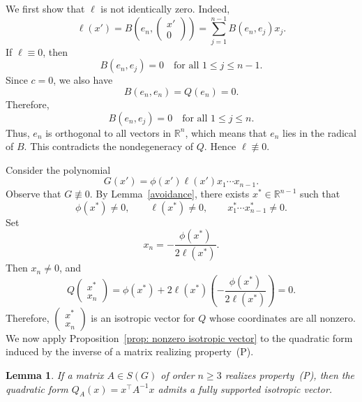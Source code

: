 \documentclass[12pt,reqno]{amsart}
\newtheorem{lem}[thm]{Lemma}
\theoremstyle{definition}
\numberwithin{equation}{subsection}
\newenvironment{pf}{\proof}{\endproof}
\numberwithin{equation}{section}
\begin{document}
\begin{pf}
We first show that $\ell$ is not identically zero. Indeed,
\[
\ell(x')=
B\left(e_n,\begin{pmatrix}x'\\0\end{pmatrix}\right)
=
\sum_{j=1}^{n-1}B(e_n,e_j)x_j.
\]
If $\ell\equiv 0$, then
\[
B(e_n,e_j)=0
\quad\text{for all } 1\le j\le n-1.
\]
Since $c=0$, we also have
\[
B(e_n,e_n)=Q(e_n)=0.
\]
Therefore,
\[
B(e_n,e_j)=0
\quad\text{for all } 1\le j\le n.
\]
Thus, $e_n$ is orthogonal to all vectors in $\mathbb{R}^n$, which means that
$e_n$ lies in the radical of $B$. This contradicts the nondegeneracy of $Q$.
Hence $\ell\not\equiv 0$.

Consider the polynomial
\[
G(x')=\phi(x')\ell(x')x_1\cdots x_{n-1}.
\]
Observe that $G\not\equiv 0$. By Lemma~\ref{avoidance}, there exists
$x^\ast\in\mathbb{R}^{n-1}$ such that
\[
\phi(x^\ast)\neq 0,\qquad
\ell(x^\ast)\neq 0,\qquad
x_1^\ast\cdots x_{n-1}^\ast\neq 0.
\]
Set
\[
x_n=-\frac{\phi(x^\ast)}{2\ell(x^\ast)}.
\]
Then $x_n\neq 0$, and
\[
Q\begin{pmatrix}x^\ast\\x_n\end{pmatrix}
=
\phi(x^\ast)+2\ell(x^\ast)
\left(-\frac{\phi(x^\ast)}{2\ell(x^\ast)}\right)
=0.
\]
Therefore,
\(
\begin{pmatrix}x^\ast\\x_n\end{pmatrix}
\)
is an isotropic vector for $Q$ whose coordinates are all nonzero.
\end{pf}
We now apply Proposition~\ref{prop: nonzero isotropic vector} to the quadratic form induced by the inverse of a matrix realizing property~(P).

\begin{lem}\label{lem:isotropic_inverse}
If a matrix $A \in S(G)$ of order $n \ge 3$ realizes property~(P), then the quadratic form $Q_A(x) = x^\top A^{-1} x$ admits a fully supported isotropic vector.
\end{lem}
\end{document}
